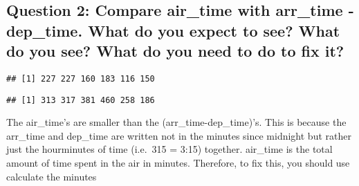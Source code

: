 \documentclass[
]{book}
\newenvironment{Shaded}{\begin{snugshade}}{\end{snugshade}}
\newcommand{\DataTypeTok}[1]{\textcolor[rgb]{0.13,0.29,0.53}{#1}}
\newcommand{\DecValTok}[1]{\textcolor[rgb]{0.00,0.00,0.81}{#1}}
\newcommand{\KeywordTok}[1]{\textcolor[rgb]{0.13,0.29,0.53}{\textbf{#1}}}
\newcommand{\NormalTok}[1]{#1}
\newcommand{\OperatorTok}[1]{\textcolor[rgb]{0.81,0.36,0.00}{\textbf{#1}}}
\newcommand{\StringTok}[1]{\textcolor[rgb]{0.31,0.60,0.02}{#1}}
\begin{document}
\begin{Shaded}
\end{Shaded}

\hypertarget{question-2-compare-air_time-with-arr_time---dep_time.-what-do-you-expect-to-see-what-do-you-see-what-do-you-need-to-do-to-fix-it}{%
\subsection{Question 2: Compare air\_time with arr\_time - dep\_time. What do you expect to see? What do you see? What do you need to do to fix it?}\label{question-2-compare-air_time-with-arr_time---dep_time.-what-do-you-expect-to-see-what-do-you-see-what-do-you-need-to-do-to-fix-it}}

\begin{Shaded}
\end{Shaded}

\begin{verbatim}
## [1] 227 227 160 183 116 150
\end{verbatim}

\begin{Shaded}
\end{Shaded}

\begin{verbatim}
## [1] 313 317 381 460 258 186
\end{verbatim}

The air\_time's are smaller than the (arr\_time-dep\_time)'s. This is because the arr\_time and dep\_time are written not in the minutes since midnight but rather just the hourminutes of time (i.e.~315 = 3:15) together. air\_time is the total amount of time spent in the air in minutes. Therefore, to fix this, you should use calculate the minutes

  
\end{document}
